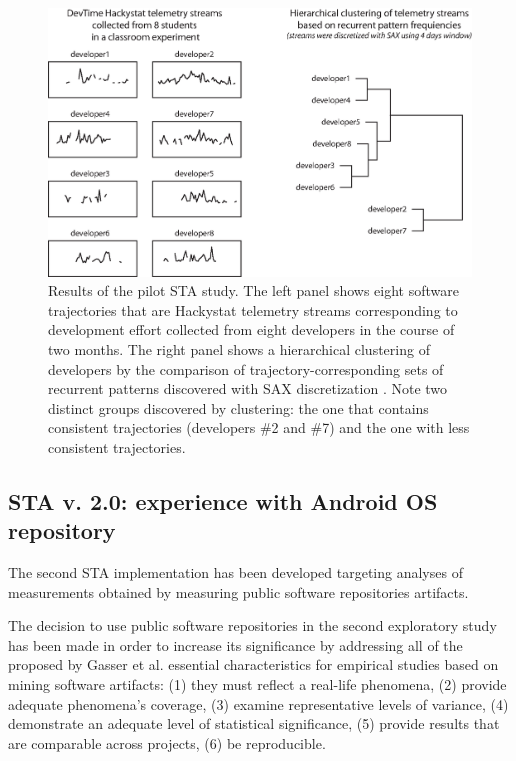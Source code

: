 \begin{figure}[t]
   \centering
   \includegraphics[width=145mm]{figures/STA1.eps}
   \caption{Results of the pilot STA study. 
   The left panel shows eight software trajectories that are Hackystat telemetry streams 
   corresponding to development effort \cite{citeulike:557296} collected from eight developers in the course of two months.
   The right panel shows a hierarchical clustering of developers by the comparison of trajectory-corresponding sets of 
   recurrent patterns discovered with SAX discretization \cite{sax}. 
   Note two distinct groups discovered by clustering: the one that contains consistent trajectories (developers \#2 and \#7) 
   and the one with less consistent trajectories.}
   \label{fig:STA1-results}
\end{figure}


\subsection{STA v. 2.0: experience with Android OS repository}
The second STA implementation has been developed targeting analyses of measurements obtained by measuring 
public software repositories artifacts.

The decision to use public software repositories in the second exploratory study has been made in order to increase its 
significance by addressing all of the proposed by Gasser et al. \cite{citeulike:13058334} essential characteristics for 
empirical studies based on mining software artifacts:  
(1) they must reflect a real-life phenomena, 
(2) provide adequate phenomena's coverage, 
(3) examine representative levels of variance, 
(4) demonstrate an adequate level of statistical significance,
(5) provide results that are comparable across projects,
(6) be reproducible. 

